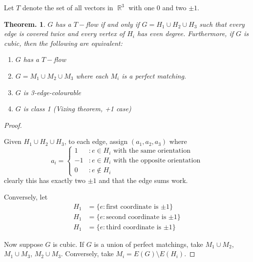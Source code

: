 \documentclass[11pt, a4paper]{memoir}
\DeclareMathOperator{\R}{{\mathbb{R}}}
\theoremstyle{change}
\newtheorem{theorem}{Theorem.}[section]
\theoremstyle{plain}
\theoremstyle{nonumberplain}
\newtheorem{proof}{Proof}
\numberwithin{equation}{section}
\begin{document}
Let $T$ denote the set of all vectors in $\R^3$ with one 0 and two $\pm 1$.
\begin{theorem}
    $G$ has a $T-$flow if and only if $G=H_1\cup H_2\cup H_3$ such that every edge is covered twice and every vertex of $H_i$ has even degree.
    Furthermore, if $G$ is cubic, then the following are equivalent:
    \begin{enumerate}[nl,r]
        \item $G$ has a $T-$flow
        \item $G=M_1\cup M_2\cup M_3$ where each $M_i$ is a perfect matching.
        \item $G$ is 3-edge-colourable
        \item $G$ is class 1 (Vizing theorem, +1 case)
    \end{enumerate}
\end{theorem}
\begin{proof}
    \begin{center}
    \end{center}
    Given $H_1\cup H_2\cup H_3$, to each edge, assign $(a_1,a_2,a_3)$ where
    \begin{equation*}
        a_i =
        \begin{cases}
            1 &: e\in H_i\text{ with the same orientation}\\
            -1 &:e\in H_i\text{ with the opposite orientation}\\
            0 &: e\notin H_i
        \end{cases}
    \end{equation*}
    clearly this has exactly two $\pm 1$ and that the edge sums work.

    Conversely, let
    \begin{align*}
        H_1 &= \{e:\text{first coordinate is $\pm 1$}\}\\
        H_1 &= \{e:\text{second coordinate is $\pm 1$}\}\\
        H_1 &= \{e:\text{third coordinate is $\pm 1$}\}
    \end{align*}

    Now suppose $G$ is cubic.
    If $G$ is a union of perfect matchings, take $M_1\cup M_2$, $M_1\cup M_3$, $M_2\cup M_3$.
    Conversely, take $M_i=E(G)\setminus E(H_i)$.
\end{proof}
\end{document}
